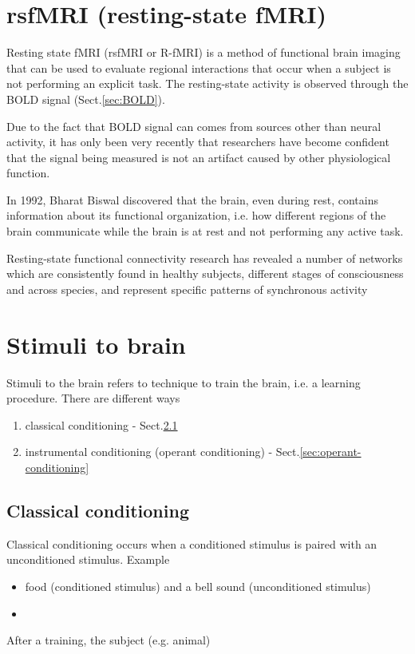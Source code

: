 \section{rsfMRI (resting-state fMRI)}
\label{sec:rsfMRI}
\label{sec:resting-state-fMRI}

Resting state fMRI (rsfMRI or R-fMRI) is a method of functional brain imaging
that can be used to evaluate regional interactions that occur when a subject is
not performing an explicit task.
The resting-state activity is observed through the BOLD signal
(Sect.\ref{sec:BOLD}).

Due to the fact that BOLD signal can comes from sources other than neural
activity, it has only been very recently that researchers have become confident
that the signal being measured is not an artifact caused by other physiological
function.

In 1992,  Bharat Biswal discovered that the brain, even during rest, contains
information about its functional organization, i.e. how different regions of the
brain communicate while the brain is at rest and not performing any active task.


Resting-state functional connectivity research has revealed a number of networks
which are consistently found in healthy subjects, different stages of
consciousness and across species, and represent specific patterns of synchronous
activity

\section{Stimuli to brain}
\label{sec:stimuli-study}

Stimuli to the brain refers to technique to train the brain, i.e. a learning
procedure. There are different ways
\begin{enumerate}
  \item classical conditioning - Sect.\ref{sec:classical-conditioning}
  
  \item instrumental conditioning (operant conditioning) -
  Sect.\ref{sec:operant-conditioning}
\end{enumerate}

\subsection{Classical conditioning}
\label{sec:classical-conditioning}

Classical conditioning occurs when a conditioned stimulus is paired with an
unconditioned stimulus.  Example
\begin{itemize}
  \item food (conditioned stimulus) and a bell sound (unconditioned stimulus)
  
  \item  
\end{itemize}
After a training, the subject (e.g. animal) 


